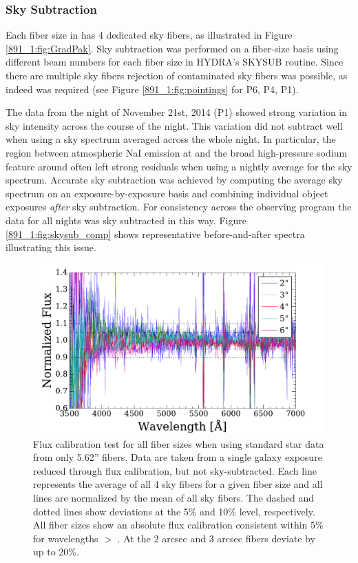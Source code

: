 \subsubsection{Sky Subtraction}
\label{891_1:sec:skysub}

Each fiber size in \GP has 4 dedicated sky fibers, as illustrated in
Figure \ref{891_1:fig:GradPak}.  Sky subtraction was performed on a
fiber-size basis using different beam numbers for each fiber size in
HYDRA's SKYSUB routine.  Since there are multiple sky fibers rejection
of contaminated sky fibers was possible, as indeed was required (see
Figure \ref{891_1:fig:pointings} for P6, P4, P1).

The data from the night of November 21st, 2014 (P1) showed strong
variation in sky intensity across the course of the night. This
variation did not subtract well when using a sky spectrum averaged
across the whole night. In particular, the region between atmospheric
NaI emission at  and the broad high-pressure sodium
feature around  often left strong residuals when using
a nightly average for the sky spectrum. Accurate sky subtraction was
achieved by computing the average sky spectrum on an
exposure-by-exposure basis and combining individual object exposures
\emph{after} sky subtraction. For consistency across the observing
program the data for all nights was sky subtracted in this way. Figure
\ref{891_1:fig:skysub_comp} shows representative before-and-after spectra
illustrating this issue.

\begin{figure}
  \centering
  \includegraphics[width=\columnwidth]{891_1/figs/flux_cal_test.pdf}
  \caption[Comparison of flux calibration across multiple fibe
  sizes]{ \label{891_1:fig:sky_flux_comp}\fixspacing Flux calibration test
    for all fiber sizes when using standard star data from only 5.62''
    fibers. Data are taken from a single galaxy exposure reduced
    through flux calibration, but not sky-subtracted. Each line
    represents the average of all 4 sky fibers for a given fiber size
    and all lines are normalized by the mean of all sky fibers. The
    dashed and dotted lines show deviations at the 5\% and 10\% level,
    respectively. All fiber sizes show an absolute flux calibration
    consistent within 5\% for wavelengths $>$ . At
     the 2 arcsec and 3 arcsec fibers deviate by up to
    20\%.}
\end{figure}

